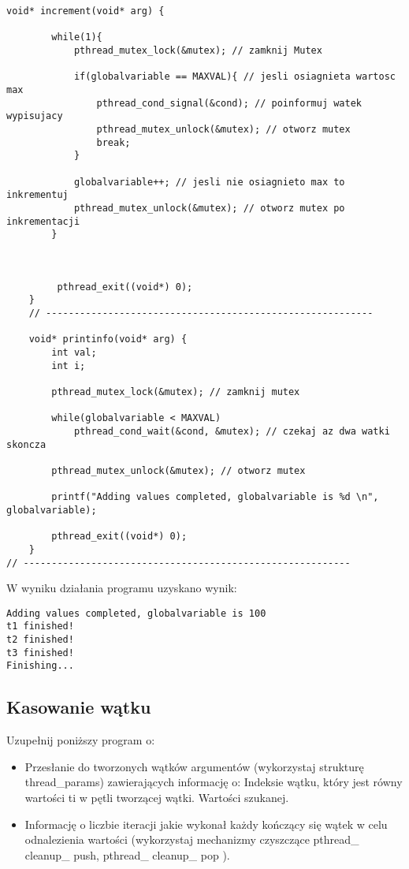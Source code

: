 \documentclass[a4paper,15pt]{article}
\newcommand{\assignment}[2]{
    \begin{tcolorbox}[colback=black!5!white,colframe=black,title={Zadanie #1}]
        #2
    \end{tcolorbox}
}
\begin{document}
\begin{lstlisting}[style=CStyle, label=some-code, caption=Zadanie 4 - cond.c]
    void* increment(void* arg) {

        while(1){
            pthread_mutex_lock(&mutex); // zamknij Mutex

            if(globalvariable == MAXVAL){ // jesli osiagnieta wartosc max
                pthread_cond_signal(&cond); // poinformuj watek wypisujacy
                pthread_mutex_unlock(&mutex); // otworz mutex
                break;
            }

            globalvariable++; // jesli nie osiagnieto max to inkrementuj
            pthread_mutex_unlock(&mutex); // otworz mutex po inkrementacji
        }

        

         pthread_exit((void*) 0);
    }
    // ----------------------------------------------------------
     
    void* printinfo(void* arg) {
        int val;
        int i;

        pthread_mutex_lock(&mutex); // zamknij mutex

        while(globalvariable < MAXVAL)
            pthread_cond_wait(&cond, &mutex); // czekaj az dwa watki skoncza

        pthread_mutex_unlock(&mutex); // otworz mutex

        printf("Adding values completed, globalvariable is %d \n", globalvariable);

        pthread_exit((void*) 0);
    }
// ----------------------------------------------------------
\end{lstlisting}

W wyniku działania programu uzyskano wynik:

\begin{lstlisting}[style=CStyle, label=some-code, caption=Zadanie 4 - cond.c - wynik dzialania]
Adding values completed, globalvariable is 100 
t1 finished!
t2 finished!
t3 finished!
Finishing...
\end{lstlisting}

\newpage
\subsection{Kasowanie wątku}
\assignment{5}{
Uzupełnij poniższy program o:
\begin{itemize}
\item Przesłanie do tworzonych wątków argumentów (wykorzystaj strukturę thread\_params) zawierających informację o: Indeksie wątku, który jest równy wartości ti w pętli tworzącej wątki. Wartości szukanej.
\item Informację o liczbie iteracji jakie wykonał każdy kończący się wątek w celu odnalezienia wartości (wykorzystaj mechanizmy czyszczące pthread\_ cleanup\_ push, pthread\_ cleanup\_ pop ).
\end{itemize}
}
\end{document}
